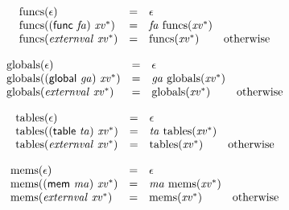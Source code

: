 \vspace{1ex}

$$
\begin{array}{@{}lcl@{}l@{}}
{\mathrm{funcs}}(\epsilon) &=& \epsilon &  \\
{\mathrm{funcs}}((\mathsf{func}~{\mathit{fa}})~{{\mathit{xv}}^\ast}) &=& {\mathit{fa}}~{\mathrm{funcs}}({{\mathit{xv}}^\ast}) &  \\
{\mathrm{funcs}}({\mathit{externval}}~{{\mathit{xv}}^\ast}) &=& {\mathrm{funcs}}({{\mathit{xv}}^\ast}) &\quad
  \mbox{otherwise} \\
\end{array}
$$

$$
\begin{array}{@{}lcl@{}l@{}}
{\mathrm{globals}}(\epsilon) &=& \epsilon &  \\
{\mathrm{globals}}((\mathsf{global}~{\mathit{ga}})~{{\mathit{xv}}^\ast}) &=& {\mathit{ga}}~{\mathrm{globals}}({{\mathit{xv}}^\ast}) &  \\
{\mathrm{globals}}({\mathit{externval}}~{{\mathit{xv}}^\ast}) &=& {\mathrm{globals}}({{\mathit{xv}}^\ast}) &\quad
  \mbox{otherwise} \\
\end{array}
$$

$$
\begin{array}{@{}lcl@{}l@{}}
{\mathrm{tables}}(\epsilon) &=& \epsilon &  \\
{\mathrm{tables}}((\mathsf{table}~{\mathit{ta}})~{{\mathit{xv}}^\ast}) &=& {\mathit{ta}}~{\mathrm{tables}}({{\mathit{xv}}^\ast}) &  \\
{\mathrm{tables}}({\mathit{externval}}~{{\mathit{xv}}^\ast}) &=& {\mathrm{tables}}({{\mathit{xv}}^\ast}) &\quad
  \mbox{otherwise} \\
\end{array}
$$

$$
\begin{array}{@{}lcl@{}l@{}}
{\mathrm{mems}}(\epsilon) &=& \epsilon &  \\
{\mathrm{mems}}((\mathsf{mem}~{\mathit{ma}})~{{\mathit{xv}}^\ast}) &=& {\mathit{ma}}~{\mathrm{mems}}({{\mathit{xv}}^\ast}) &  \\
{\mathrm{mems}}({\mathit{externval}}~{{\mathit{xv}}^\ast}) &=& {\mathrm{mems}}({{\mathit{xv}}^\ast}) &\quad
  \mbox{otherwise} \\
\end{array}
$$

\vspace{1ex}

\vspace{1ex}

